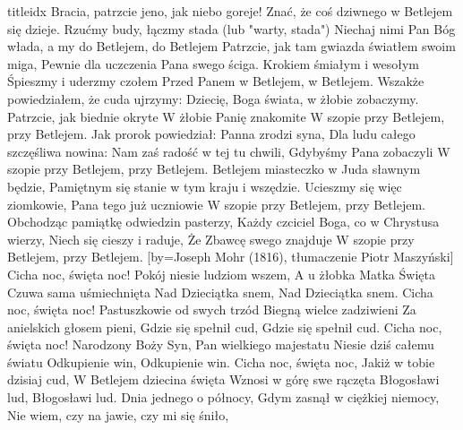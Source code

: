 \documentclass[a5paper, portrait, 12pt]{mwart}
\begin{document}
\begin{songs}{titleidx}
\beginverse
    Bracia, patrzcie jeno, jak niebo goreje!
    Znać, że coś dziwnego w Betlejem się dzieje.
    Rzućmy budy, łączmy stada (lub "warty, stada")
    Niechaj nimi Pan Bóg włada, a my do Betlejem, do Betlejem
\endverse
\beginverse
    Patrzcie, jak tam gwiazda światłem swoim miga,
    Pewnie dla uczczenia Pana swego ściga.
    Krokiem śmiałym i wesołym
    Śpieszmy i uderzmy czołem
    Przed Panem w Betlejem, w Betlejem.
\endverse
\beginverse
    Wszakże powiedziałem, że cuda ujrzymy:
    Dziecię, Boga świata, w żłobie zobaczymy.
    Patrzcie, jak biednie okryte
    W żłobie Panię znakomite
    W szopie przy Betlejem, przy Betlejem.
\endverse
\beginverse
    Jak prorok powiedział: Panna zrodzi syna,
    Dla ludu całego szczęśliwa nowina:
    Nam zaś radość w tej tu chwili,
    Gdybyśmy Pana zobaczyli
    W szopie przy Betlejem, przy Betlejem.
\endverse
\beginverse
    Betlejem miasteczko w Juda sławnym będzie,
    Pamiętnym się stanie w tym kraju i wszędzie.
    Ucieszmy się więc ziomkowie,
    Pana tego już uczniowie
    W szopie przy Betlejem, przy Betlejem.
\endverse
\beginverse
    Obchodząc pamiątkę odwiedzin pasterzy,
    Każdy czciciel Boga, co w Chrystusa wierzy,
    Niech się cieszy i raduje,
    Że Zbawcę swego znajduje
    W szopie przy Betlejem, przy Betlejem.
\endverse
\endsong
[by={Joseph Mohr (1816), tłumaczenie Piotr Maszyński}]
\beginverse
    Cicha noc, święta noc!
    Pokój niesie ludziom wszem,
    A u żłobka Matka Święta
    Czuwa sama uśmiechnięta
    Nad Dzieciątka snem,
    Nad Dzieciątka snem.
\endverse
\beginverse
    Cicha noc, święta noc!
    Pastuszkowie od swych trzód
    Biegną wielce zadziwieni
    Za anielskich głosem pieni,
    Gdzie się spełnił cud,
    Gdzie się spełnił cud.
\endverse
\beginverse
    Cicha noc, święta noc!
    Narodzony Boży Syn,
    Pan wielkiego majestatu
    Niesie dziś całemu światu
    Odkupienie win,
    Odkupienie win.
\endverse
\beginverse
    Cicha noc, święta noc,
    Jakiż w tobie dzisiaj cud,
    W Betlejem dziecina święta
    Wznosi w górę swe rączęta
    Błogosławi lud,
    Błogosławi lud.
\endverse
\endsong
\beginverse
    Dnia jednego o północy,
    Gdym zasnął w ciężkiej niemocy,
\endverse
  \beginchorus
      Nie wiem, czy na jawie, czy mi się śniło,

\end{songs}
\end{document}
